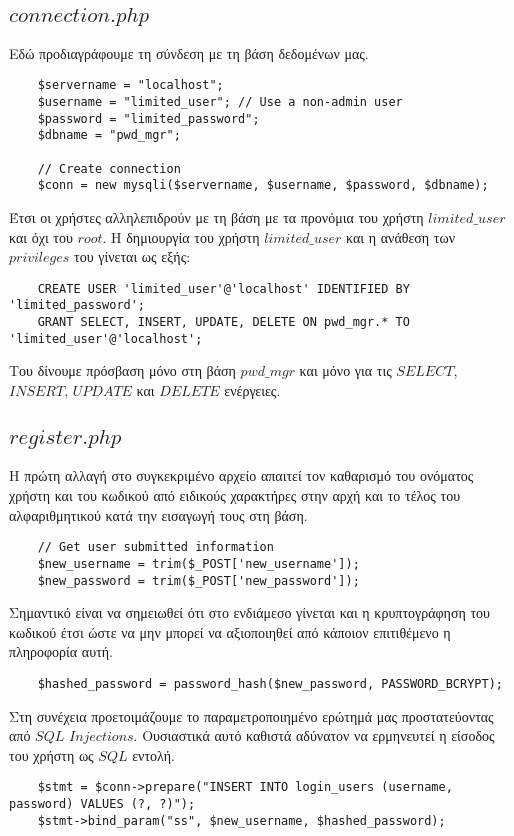 \documentclass{report}
\begin{document}
\subsection*{$connection.php$}
Εδώ προδιαγράφουμε τη σύνδεση με τη βάση δεδομένων μας. 
\begin{verbatim}
    $servername = "localhost";
    $username = "limited_user"; // Use a non-admin user
    $password = "limited_password";
    $dbname = "pwd_mgr";

    // Create connection
    $conn = new mysqli($servername, $username, $password, $dbname);
\end{verbatim}
Έτσι οι χρήστες αλληλεπιδρούν με τη βάση με τα προνόμια του χρήστη $limited\_user$ και όχι του $root$. 
Η δημιουργία του χρήστη $limited\_user$ και η ανάθεση των $privileges$ του γίνεται ως εξής:
\begin{verbatim}
    CREATE USER 'limited_user'@'localhost' IDENTIFIED BY 'limited_password';
    GRANT SELECT, INSERT, UPDATE, DELETE ON pwd_mgr.* TO 'limited_user'@'localhost';
\end{verbatim}
Του δίνουμε πρόσβαση μόνο στη βάση $pwd\_mgr$ και μόνο για τις $SELECT$, $INSERT$, $UPDATE$ και 
$DELETE$ ενέργειες.
\subsection*{$register.php$}
Η πρώτη αλλαγή στο συγκεκριμένο αρχείο απαιτεί τον καθαρισμό του ονόματος χρήστη και του κωδικού
από ειδικούς χαρακτήρες στην αρχή και το τέλος του αλφαριθμητικού κατά την εισαγωγή τους στη βάση.
\begin{verbatim}
    // Get user submitted information
    $new_username = trim($_POST['new_username']);
    $new_password = trim($_POST['new_password']);
\end{verbatim}
Σημαντικό είναι να σημειωθεί ότι στο ενδιάμεσο γίνεται και η κρυπτογράφηση του κωδικού έτσι ώστε να 
μην μπορεί να αξιοποιηθεί από κάποιον επιτιθέμενο η πληροφορία αυτή.
\begin{verbatim}
    $hashed_password = password_hash($new_password, PASSWORD_BCRYPT);
\end{verbatim}
Στη συνέχεια προετοιμάζουμε το παραμετροποιημένο ερώτημά μας προστατεύοντας από $SQL$ $Injections$. 
Ουσιαστικά αυτό καθιστά αδύνατον να ερμηνευτεί η είσοδος του χρήστη ως $SQL$ εντολή.
\begin{verbatim}
    $stmt = $conn->prepare("INSERT INTO login_users (username, password) VALUES (?, ?)");
    $stmt->bind_param("ss", $new_username, $hashed_password);
\end{verbatim}
\end{document}
